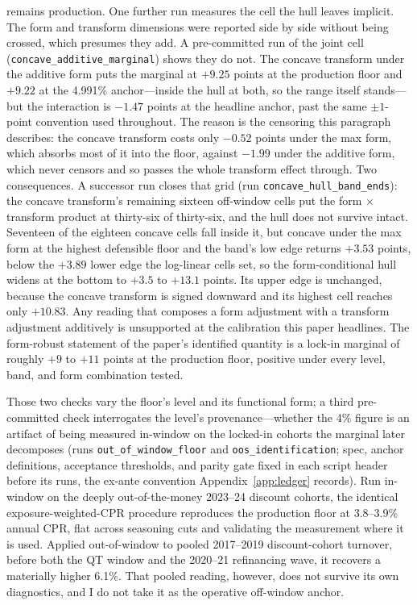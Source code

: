 \documentclass[12pt]{article}
\begin{document}
remains production. One further run measures the cell the hull leaves implicit. The form and transform dimensions were reported side by side without being crossed, which presumes they add. A pre-committed run of the joint cell (\texttt{concave\_additive\_marginal}) shows they do not. The concave transform under the additive form puts the marginal at $+9.25$ points at the production floor and $+9.22$ at the 4.991\% anchor---inside the hull at both, so the range itself stands---but the interaction is $-1.47$ points at the headline anchor, past the same $\pm 1$-point convention used throughout. The reason is the censoring this paragraph describes: the concave transform costs only $-0.52$ points under the max form, which absorbs most of it into the floor, against $-1.99$ under the additive form, which never censors and so passes the whole transform effect through. Two consequences. A successor run closes that grid (run \texttt{concave\_hull\_band\_ends}): the concave transform's remaining sixteen off-window cells put the form $\times$ transform product at thirty-six of thirty-six, and the hull does not survive intact. Seventeen of the eighteen concave cells fall inside it, but concave under the max form at the highest defensible floor and the band's low edge returns $+3.53$ points, below the $+3.89$ lower edge the log-linear cells set, so the form-conditional hull widens at the bottom to $+3.5$ to $+13.1$ points. Its upper edge is unchanged, because the concave transform is signed downward and its highest cell reaches only $+10.83$. Any reading that composes a form adjustment with a transform adjustment additively is unsupported at the calibration this paper headlines. The form-robust statement of the paper's identified quantity is a lock-in marginal of roughly $+9$ to $+11$ points at the production floor, positive under every level, band, and form combination tested.

Those two checks vary the floor's level and its functional form; a third pre-committed check interrogates the level's provenance---whether the 4\% figure is an artifact of being measured in-window on the locked-in cohorts the marginal later decomposes (runs \texttt{out\_of\_window\_floor} and \texttt{oos\_identification}; spec, anchor definitions, acceptance thresholds, and parity gate fixed in each script header before its runs, the ex-ante convention Appendix~\ref{app:ledger} records). Run in-window on the deeply out-of-the-money 2023--24 discount cohorts, the identical exposure-weighted-CPR procedure reproduces the production floor at 3.8--3.9\% annual CPR, flat across seasoning cuts and validating the measurement where it is used. Applied out-of-window to pooled 2017--2019 discount-cohort turnover, before both the QT window and the 2020--21 refinancing wave, it recovers a materially higher 6.1\%. That pooled reading, however, does not survive its own diagnostics, and I do not take it as the operative off-window anchor.
\end{document}
